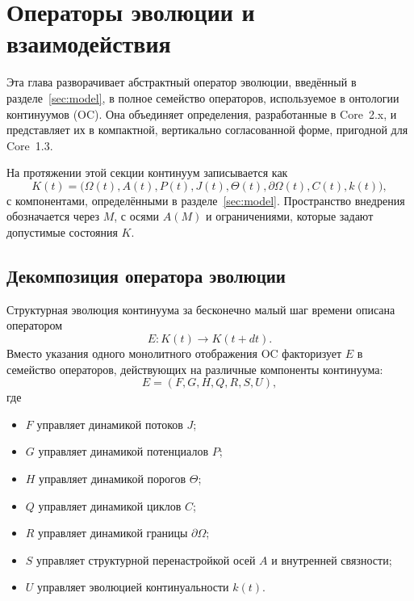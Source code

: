 
\section{Операторы эволюции и взаимодействия}
\label{sec:operators-full}

Эта глава разворачивает абстрактный оператор эволюции, введённый в
разделе~\ref{sec:model}, в полное семейство операторов, используемое в
онтологии континуумов (OC). Она объединяет определения, разработанные в
Core~2.x, и представляет их в компактной, вертикально согласованной форме,
пригодной для Core~1.3.

На протяжении этой секции континуум записывается как
\[
  K(t) =
  \big(
    \Omega(t), A(t), P(t), J(t),
    \Theta(t), \partial\Omega(t), C(t), k(t)
  \big),
\]
с компонентами, определёнными в разделе~\ref{sec:model}. Пространство
внедрения обозначается через \(M\), с осями \(A(M)\) и ограничениями,
которые задают допустимые состояния \(K\).

\subsection{Декомпозиция оператора эволюции}

Структурная эволюция континуума за бесконечно малый шаг времени
описана оператором
\[
  E : K(t) \longrightarrow K(t+dt).
\]
Вместо указания одного монолитного отображения OC факторизует \(E\) в семейство
операторов, действующих на различные компоненты континуума:
\[
  E = (F, G, H, Q, R, S, U),
\]
где
\begin{itemize}
  \item \(F\) управляет динамикой потоков \(J\);
  \item \(G\) управляет динамикой потенциалов \(P\);
  \item \(H\) управляет динамикой порогов \(\Theta\);
  \item \(Q\) управляет динамикой циклов \(C\);
  \item \(R\) управляет динамикой границы \(\partial\Omega\);
  \item \(S\) управляет структурной перенастройкой осей \(A\) и внутренней
        связности;
  \item \(U\) управляет эволюцией континуальности \(k(t)\).
\end{itemize}

